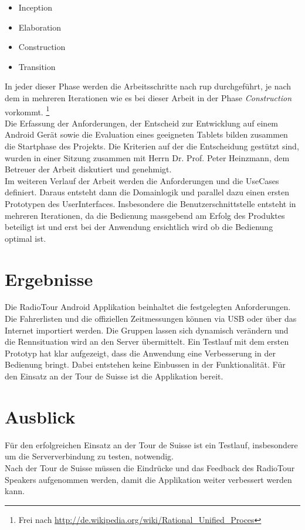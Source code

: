\begin{itemize}
\item Inception
\item Elaboration
\item Construction
\item Transition
\end{itemize}

In jeder dieser Phase werden die Arbeitsschritte nach \gls{rup} durchgeführt, je nach dem in mehreren Iterationen wie es bei dieser Arbeit in der Phase \textit{Construction} vorkommt. \footnote{Frei nach \url{http://de.wikipedia.org/wiki/Rational_Unified_Proces}}
\\
Die Erfassung der Anforderungen, der Entscheid zur Entwicklung auf einem Android Gerät sowie die Evaluation eines geeigneten Tablets bilden zusammen die Startphase des Projekts. Die Kriterien auf der die Entscheidung gestützt sind, wurden in einer Sitzung zusammen mit Herrn Dr. Prof. Peter Heinzmann, dem Betreuer der Arbeit diskutiert und genehmigt.
\\
Im weiteren Verlauf der Arbeit werden die Anforderungen und die UseCases definiert. Daraus entsteht dann die Domainlogik und parallel dazu einen ersten Prototypen des UserInterfaces. Insbesondere die Benutzerschnittstelle entsteht in mehreren Iterationen, da die Bedienung massgebend am Erfolg des Produktes beteiligt ist und erst bei der Anwendung ersichtlich wird ob die Bedienung optimal ist.

\section*{Ergebnisse}
Die RadioTour Android Applikation beinhaltet die festgelegten Anforderungen. Die Fahrerlisten und die offiziellen Zeitmessungen können via USB oder über das Internet importiert werden. Die Gruppen lassen sich dynamisch verändern und die Rennsituation wird an den Server übermittelt. Ein Testlauf mit dem ersten Prototyp hat klar aufgezeigt, dass die Anwendung eine Verbesserung in der Bedienung bringt. Dabei entstehen keine Einbussen in der Funktionalität. Für den Einsatz an der Tour de Suisse ist die Applikation bereit.


\section*{Ausblick}
Für den erfolgreichen Einsatz an der Tour de Suisse ist ein Testlauf, insbesondere um die Serververbindung zu testen, notwendig.
\\
Nach der Tour de Suisse müssen die Eindrücke und das Feedback des RadioTour Speakers aufgenommen werden, damit die Applikation weiter verbessert werden kann.